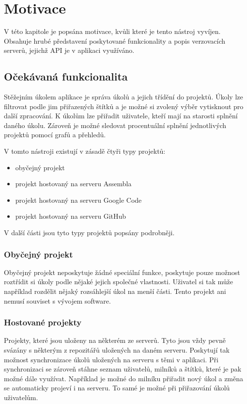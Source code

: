 \chapter{Motivace}

V této kapitole je popsána motivace, kvůli které je tento nástroj vyvíjen. Obsahuje hrubé představení poskytované funkcionality a popis verzovacích serverů, jejichž API je v aplikaci využíváno.

\section{Očekávaná funkcionalita}

Stěžejním úkolem aplikace je správa úkolů a jejich třídění do projektů. Úkoly lze filtrovat podle jim přiřazených štítků a je možné si zvolený výběr vytisknout pro další zpracování. K úkolům lze přiřadit uživatele, kteří mají na starosti splnění daného úkolu. Zároveň je možné sledovat procentuální splnění jednotlivých projektů pomocí grafů a přehledů.

V tomto nástroji existují v zásadě čtyři typy projektů:

\begin{itemize}
\item obyčejný projekt
\item projekt hostovaný na serveru Assembla
\item projekt hostovaný na serveru Google Code
\item projekt hostovaný na serveru GitHub
\end{itemize}

V další části jsou tyto typy projektů popsány podrobněji.

\subsection{Obyčejný projekt}

Obyčejný projekt neposkytuje žádné speciální funkce, poskytuje pouze možnost roztřídit si úkoly podle nějaké jejich společné vlastnosti. Uživatel si tak může například rozdělit nějaký rozsáhlejší úkol na menší části. Tento projekt ani nemusí souviset s vývojem software.

\subsection{Hostované projekty}

Projekty, které jsou uloženy na některém ze serverů. Tyto jsou vždy pevně svázány s některým z repozitářů uložených na daném serveru. Poskytují tak možnost synchronizace úkolů uložených na serveru s těmi v aplikaci. Při synchronizaci se zároveň stáhne seznam uživatelů, milníků a štítků, které je pak možné dále využívat. Například je možné do milníku přiřadit nový úkol a změna se automaticky projeví i na serveru. To samé je možné při přiřazování úkolů uživatelům.

